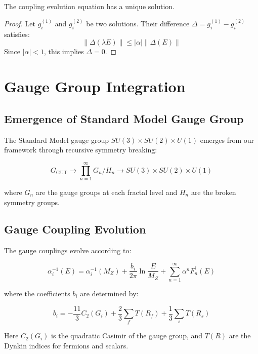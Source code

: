 \documentclass{article}
\begin{document}
\begin{theorem}
The coupling evolution equation has a unique solution.
\end{theorem}

\begin{proof}
Let $g_i^{(1)}$ and $g_i^{(2)}$ be two solutions. Their difference $\Delta = g_i^{(1)} - g_i^{(2)}$ satisfies:
\[
\|\Delta(\lambda E)\| \leq |\alpha|\|\Delta(E)\|
\]
Since $|\alpha| < 1$, this implies $\Delta = 0$.
\end{proof}

\section{Gauge Group Integration}
\label{app:gauge}

\subsection{Emergence of Standard Model Gauge Group}

The Standard Model gauge group $SU(3) \times SU(2) \times U(1)$ emerges from our framework through recursive symmetry breaking:

\begin{equation}
G_{\text{GUT}} \to \prod_{n=1}^{\infty} G_n/H_n \to SU(3) \times SU(2) \times U(1)
\end{equation}

where $G_n$ are the gauge groups at each fractal level and $H_n$ are the broken symmetry groups.

\subsection{Gauge Coupling Evolution}

The gauge couplings evolve according to:

\begin{equation}
\alpha_i^{-1}(E) = \alpha_i^{-1}(M_Z) + \frac{b_i}{2\pi}\ln\frac{E}{M_Z} + \sum_{n=1}^{\infty} \alpha^n F_n^i(E)
\end{equation}

where the coefficients $b_i$ are determined by:

\begin{equation}
b_i = -\frac{11}{3}C_2(G_i) + \frac{2}{3}\sum_f T(R_f) + \frac{1}{3}\sum_s T(R_s)
\end{equation}

Here $C_2(G_i)$ is the quadratic Casimir of the gauge group, and $T(R)$ are the Dynkin indices for fermions and scalars.
\end{document}
